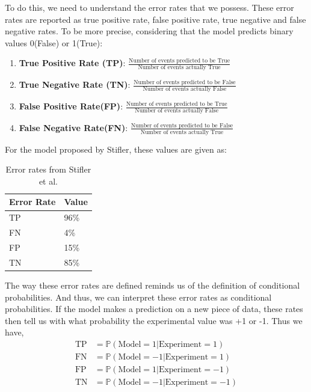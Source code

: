 \documentclass[a4paper, 12pt]{article}
\begin{document}
	To do this, we need to understand the error rates that we possess. These error rates are reported as true positive rate, false positive rate, true negative and false negative rates. To be more precise, considering that the model predicts binary values 0(False) or 1(True):

	\begin{enumerate}
	\item 
	\textbf{True Positive Rate (TP)}: $\frac{\text{Number of events predicted to be True}}{\text{Number of events actually True}}$
	\item 
	\textbf{True Negative Rate (TN)}: $\frac{\text{Number of events predicted to be False}}{\text{Number of events actually False}}$
	\item 
	\textbf{False Positive Rate(FP)}: $\frac{\text{Number of events predicted to be True}}{\text{Number of events actually False}}$
	\item 
	\textbf{False Negative Rate(FN)}: $\frac{\text{Number of events predicted to be False}}{\text{Number of events actually True}}$
	\end{enumerate}

	For the model proposed by Stifler, these values are given as:

\begin{table}[]
\centering
\caption{Error rates from Stifler et al.}
\label{tab_error_rate}
\begin{tabular}{@{}ll@{}}
\toprule
Error Rate & Value \\ \midrule
TP         & 96\%  \\
FN         & 4\%   \\
FP         & 15\%  \\
TN         & 85\%  \\ \bottomrule
\end{tabular}
\end{table}

The way these error rates are defined reminds us of the definition of conditional probabilities. And thus, we can interpret these error rates as conditional probabilities. If the model makes a prediction on a new piece of data, these rates then tell us with what probability the experimental value was +1 or -1. Thus we have, 
\begin{align}
\label{inter_cond}
\text{TP} &= \mathbb{P}(\text{Model} = 1 | \text{Experiment} = 1) \\
\text{FN} &= \mathbb{P}(\text{Model} = -1 | \text{Experiment} = 1) \\
\text{FP} &= \mathbb{P}(\text{Model} = 1 | \text{Experiment} = -1) \\
\text{TN} &= \mathbb{P}(\text{Model} = -1 | \text{Experiment} = -1)
\end{align}
\end{document}
